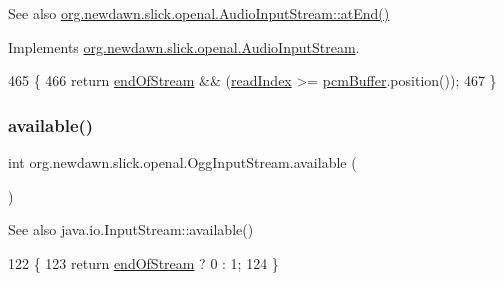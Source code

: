 \begin{DoxySeeAlso}{See also}
\mbox{\hyperlink{interfaceorg_1_1newdawn_1_1slick_1_1openal_1_1_audio_input_stream_af2234c4714c7ee9c4cecde2969f2f4b7}{org.\+newdawn.\+slick.\+openal.\+Audio\+Input\+Stream\+::at\+End()}} 
\end{DoxySeeAlso}


Implements \mbox{\hyperlink{interfaceorg_1_1newdawn_1_1slick_1_1openal_1_1_audio_input_stream_af2234c4714c7ee9c4cecde2969f2f4b7}{org.\+newdawn.\+slick.\+openal.\+Audio\+Input\+Stream}}.


\begin{DoxyCode}
465                            \{
466         \textcolor{keywordflow}{return} \mbox{\hyperlink{classorg_1_1newdawn_1_1slick_1_1openal_1_1_ogg_input_stream_ac4c417186feeb02c3cd3ecfedee09831}{endOfStream}} && (\mbox{\hyperlink{classorg_1_1newdawn_1_1slick_1_1openal_1_1_ogg_input_stream_a53b520bae4c31d5889485a0424f04478}{readIndex}} >= \mbox{\hyperlink{classorg_1_1newdawn_1_1slick_1_1openal_1_1_ogg_input_stream_a94fa1c1b12bc33364d2d885c537cc232}{pcmBuffer}}.position());
467     \}
\end{DoxyCode}
\mbox{\label{classorg_1_1newdawn_1_1slick_1_1openal_1_1_ogg_input_stream_a630130dcbd8725342e3d798670481981}} 
\subsubsection{\texorpdfstring{available()}{available()}}
{\footnotesize\ttfamily int org.\+newdawn.\+slick.\+openal.\+Ogg\+Input\+Stream.\+available (\begin{DoxyParamCaption}{ }\end{DoxyParamCaption})\hspace{0.3cm}{\ttfamily [inline]}}

\begin{DoxySeeAlso}{See also}
java.\+io.\+Input\+Stream\+::available() 
\end{DoxySeeAlso}

\begin{DoxyCode}
122                            \{
123         \textcolor{keywordflow}{return} \mbox{\hyperlink{classorg_1_1newdawn_1_1slick_1_1openal_1_1_ogg_input_stream_ac4c417186feeb02c3cd3ecfedee09831}{endOfStream}} ? 0 : 1;
124     \}
\end{DoxyCode}
\mbox{\label{classorg_1_1newdawn_1_1slick_1_1openal_1_1_ogg_input_stream_a7b9b6debc212b7f5bb2fdc6a94516fd0}} 
